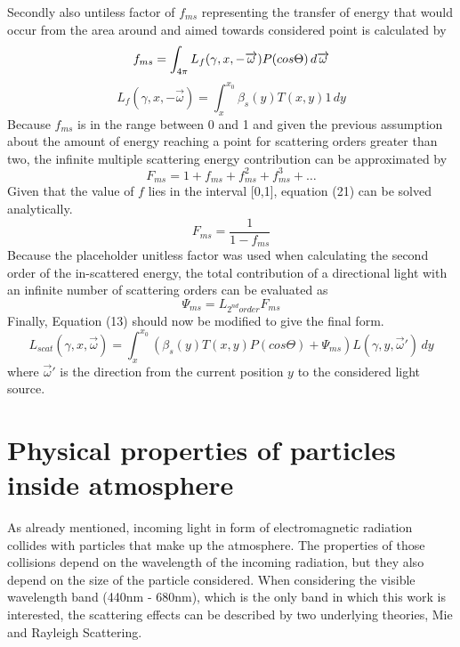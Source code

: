 \documentclass{ctuthesis}
\begin{document}
Secondly also untiless factor of \textit{$f_{ms}$} representing the transfer of energy 
that would occur from the area around and aimed towards considered point is calculated by 
\begin{equation}
\label{fms definition}
    f_{ms} = \int_{4 \pi} L_{f}(\gamma, x, -\overrightarrow{\omega}) P(cos \Theta) \,d\overrightarrow{\omega} \\
\end{equation} 
\begin{equation}
\label{Lf definition}
    L_{f}(\gamma, x, -\overrightarrow{\omega}) = \int_{x}^{x_{0}} \beta_{s}(y) T(x,y) 1 \,dy
\end{equation}
Because $f_{ms}$ is in the range between 0 and 1 and given the previous assumption about the 
amount of energy reaching a point for scattering orders greater than two, the infinite multiple
 scattering energy contribution can be approximated by
\begin{equation}
    F_{ms} = 1 + f_{ms} + f_{ms}^{2} + f_{ms}^{3} + \dots
\end{equation}
Given that the value of $f$ lies in the interval [0,1], equation (21) can be solved analytically. 
\begin{equation}
    F_{ms} = \frac{1}{1-f_{ms}}
\end{equation}
Because the placeholder unitless factor was used when calculating the second order of the in-scattered
energy, the total contribution of a directional light with an infinite number of scattering orders
can be evaluated as
\begin{equation}
\label{transfer factor equation}
    \Psi_{ms} = L_{2^{nd}order}F_{ms}
\end{equation}
Finally, Equation (13) should now be modified to give the final form.
\begin{equation}
    L_{scat}(\gamma, x, \overrightarrow{\omega}) = \int_{x}^{x_{0}} (\beta_{s}(y) T(x,y) P(cos \Theta) +  \Psi_{ms})L (\gamma, y, \overrightarrow{\omega}') \,dy
\end{equation}
where $\overrightarrow{\omega}'$ is the direction from the current position $y$ 
to the considered light source.

\section{Physical properties of particles inside atmosphere}
As already mentioned, incoming light in form of electromagnetic radiation collides with particles that make up the atmosphere. The properties of those collisions depend on the wavelength of the incoming radiation, but they also depend on the size of the particle considered. When considering the visible wavelength band (440nm - 680nm), which is the only band in which this work is interested, the scattering effects can be described by two underlying theories, Mie and Rayleigh Scattering.
    
\end{document}
